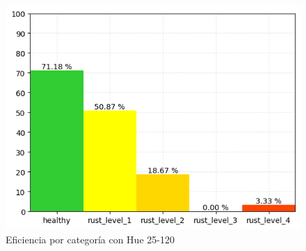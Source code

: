 \begin{figure}
\centering
\includegraphics[scale=0.6]{images/result_classes_25_120.png}
\caption{Eficiencia por categoría con Hue 25-120}
\label{img:efficiency_categories_25_120}
\end{figure}
